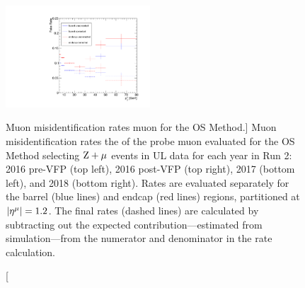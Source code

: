 \begin{figure}[!htbp]
\begin{center}
		\includegraphics[width=0.48\textwidth]{figures/higgsmassmeas/redbkg/fr/fakerates_UL2018_mu_yaxis_full.pdf}
		\caption
			[Muon misidentification rates \vs muon \pt for the OS Method.]
			{
			Muon misidentification rates \vs the \pt of the probe muon evaluated for the OS Method selecting $\mathrm{Z} + \mu$ events in UL data
			for each year in Run 2:
			2016 pre-VFP (top left),
			2016 post-VFP (top right),
			2017 (bottom left), and
			2018 (bottom right).
			Rates are evaluated separately for the barrel (blue lines) and endcap (red lines) regions,
			partitioned at $\lvert \eta^{\mu} \rvert = 1.2$.
			The final rates (dashed lines) are calculated by subtracting out the expected \WZ contribution---estimated from simulation---from the numerator and denominator in the rate calculation.
		}
		\label{fr_plots_mu}
	\end{center}
\end{figure}


